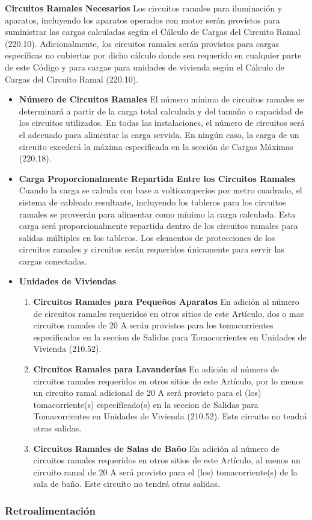 \documentclass[11pt,letterpaper]{article}
\begin{document}
\newpage
\textbf{Circuitos Ramales Necesarios} Los circuitos ramales para iluminación y aparatos, incluyendo los aparatos operados con motor serán provistos para suministrar las cargas calculadas según el Cálculo de Cargas del Circuito Ramal (220.10). Adicionalmente, los circuitos ramales serán provistos para cargas específicas no cubiertas por dicho cálculo donde sea requerido en cualquier parte de este Código y para cargas para unidades de vivienda según el Cálculo de Cargas del Circuito Ramal (220.10).
\begin{itemize}
	\item \textbf{Número de Circuitos Ramales} El número mínimo de circuitos ramales se determinará a partir de la carga total calculada y del tamaño o capacidad de los circuitos utilizados. En todas las instalaciones, el número de circuitos será el adecuado para alimentar la carga servida. En ningún caso, la carga de un circuito excederá la máxima especificada en la sección de Cargas Máximas (220.18).

	\item \textbf{Carga Proporcionalmente Repartida Entre los Circui­tos Ramales} Cuando la carga se calcula con base a voltioamperios por metro cuadrado, el sistema de cableado resultante, incluyendo los tableros para los circuitos ramales se proveerán para alimentar como mínimo la carga calculada. Esta carga será proporcionalmente repartida dentro de los circuitos ramales para salidas múltiples en los tableros. Los elementos de protecciones de los circuitos ramales y circuitos serán requeridos únicamente para servir las cargas conectadas.

	\item \textbf{Unidades de Viviendas}
		\begin{enumerate}
			\item \textbf{Circuitos Ramales para Pequeños Aparatos} En adición al número de circuitos ramales requeridos en otros sitios de este Artículo, dos o mas circuitos ramales de 20 A serán provistos para los tomacorrientes especificados en la seccion de Salidas para Tomacorrientes en Unidades de Vivienda (210.52).
			\item \textbf{Circuitos Ramales para Lavanderías} En adición al número de circuitos ramales requeridos en otros sitios de este Artículo, por lo menos un circuito ramal adicional de 20 A será provisto para el (los) tomacorriente(s) especifícado(s) en la seccion de Salidas para Tomacorrientes en Unidades de Vivienda (210.52). Este circuito no tendrá otras salidas.
			\item \textbf{Circuitos Ramales de Salas de Baño} En adición al número de circuitos ramales requeridos en otros sitios de este Artículo, al menos un circuito ramal de 20 A será provisto para el (los) tomacorriente(s) de la sala de baño. Este circuito no tendrá otras salidas.
		\end{enumerate}
\end{itemize}
\subsubsection{Retroalimentación}
\end{document}
